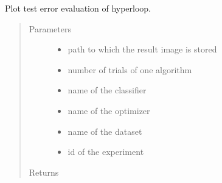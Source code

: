 \documentclass[letterpaper,10pt,english]{sphinxmanual}
\begin{document}
\begin{fulllineitems}
\label{\detokenize{index:plots.plot_hyperloop_only}}
Plot test error evaluation of hyperloop.
\begin{quote}\begin{description}
\item[{Parameters}] \leavevmode\begin{itemize}
\item {} 
 \textendash{} path to which the result image is stored

\item {} 
 \textendash{} number of trials of one algorithm

\item {} 
 \textendash{} name of the classifier

\item {} 
 \textendash{} name of the optimizer

\item {} 
 \textendash{} name of the dataset

\item {} 
 \textendash{} id of the experiment

\end{itemize}

\item[{Returns}] \leavevmode


\end{description}\end{quote}

\end{fulllineitems}

\end{document}
